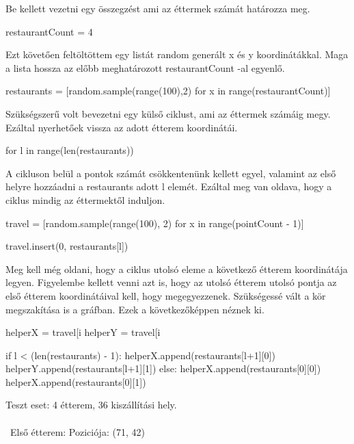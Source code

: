 Be kellett vezetni egy összegzést ami az éttermek számát határozza meg.
\begin{python}
restaurantCount = 4
\end{python}

Ezt követően feltöltöttem egy listát random generált x és y koordinátákkal. Maga a lista hossza az előbb meghatározott restaurantCount -al egyenlő.

\begin{python}
restaurants = [random.sample(range(100),2) for x in range(restaurantCount)] 
\end{python}

Szükségszerű volt bevezetni egy külső ciklust, ami az éttermek számáig megy. Ezáltal nyerhetőek vissza az adott étterem koordinátái.

\begin{python}
for l in range(len(restaurants))
\end{python}

A cikluson belül a pontok számát csökkentenünk kellett egyel, valamint az első helyre hozzáadni a restaurants adott l elemét. Ezáltal meg van oldava, hogy a ciklus mindig az éttermektől induljon.

\begin{python}
travel = [random.sample(range(100), 2) for x in range(pointCount - 1)]

travel.insert(0, restaurants[l])
\end{python}

Meg kell még oldani, hogy a ciklus utolsó eleme a következő étterem koordinátája legyen. Figyelembe kellett venni azt is, hogy az utolsó étterem utolsó pontja az első étterem koordinátáival kell, hogy megegyezzenek. Szükségessé vált a kör megszakítása is a gráfban. 
Ezek a következőképpen néznek ki. 

\begin{python}
helperX = travel[i %
helperY = travel[i %

if l < (len(restaurants) - 1):
	helperX.append(restaurants[l+1][0])
	helperY.append(restaurants[l+1][1])
else:
	helperX.append(restaurants[0][0])
	helperX.append(restaurants[0][1])
\end{python}



Teszt eset: 4 étterem, 36 kiszállítási hely. \\\
\\\
Első étterem:
Poziciója: (71, 42)

